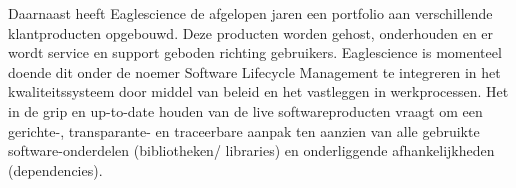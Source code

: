 Daarnaast heeft Eaglescience de afgelopen jaren een portfolio aan verschillende klantproducten opgebouwd. Deze producten worden gehost, onderhouden en er wordt service en support geboden richting gebruikers. Eaglescience is momenteel doende dit onder de noemer Software Lifecycle Management te integreren in het kwaliteitssysteem door middel van beleid en het vastleggen in werkprocessen. Het in de grip en up-to-date houden van de live softwareproducten vraagt om een gerichte-, transparante- en traceerbare aanpak ten aanzien van alle gebruikte software-onderdelen (bibliotheken/ libraries) en onderliggende afhankelijkheden (dependencies).



